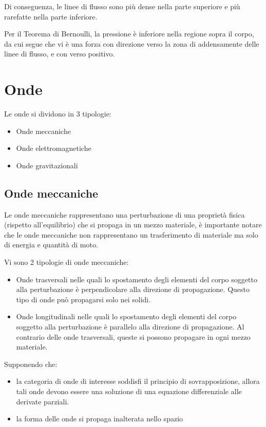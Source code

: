 \documentclass[11pt, a4paper, openright]{book}
\theoremstyle{plain}
\theoremstyle{definition}
\begin{document}
Di conseguenza, le linee di flusso sono più dense nella parte superiore e più rarefatte nella parte inferiore.

Per il Teorema di Bernoulli, la pressione è inferiore nella regione sopra il corpo, da cui segue che vi è una forza con direzione verso la zona di addensamente delle linee di flusso, e con verso positivo.   


\chapter{Onde}
Le onde si dividono in 3 tipologie:
\begin{itemize}
    \item Onde meccaniche
    \item Onde elettromagnetiche
    \item Onde gravitazionali
\end{itemize}

\section{Onde meccaniche}
Le onde meccaniche rappresentano una perturbazione di una proprietà fisica (rispetto all'equilibrio) che si propaga in un mezzo materiale, è importante notare che le onde meccaniche non rappresentano un trasferimento di materiale ma solo di energia e quantità di moto.

Vi sono 2 tipologie di onde meccaniche:
\begin{itemize}
    \item Onde trasversali nelle quali lo spostamento degli elementi del corpo soggetto alla perturbazione è perpendicolare alla direzione di propagazione. Questo tipo di onde può propagarsi solo nei solidi.
    \item Onde longitudinali nelle quali lo spostamento degli elementi del corpo soggetto alla perturbazione è parallelo alla direzione di propagazione. Al contrario delle onde trasversali, queste si possono propagare in ogni mezzo materiale.
\end{itemize}
Supponendo che:
\begin{itemize}
    \item la categoria di onde di interesse soddisfi il principio di sovrapposizione, allora tali onde devono essere una soluzione di una equazione differenziale alle derivate parziali.
    \item la forma delle onde si propaga inalterata nello spazio
\end{itemize}
\end{document}
